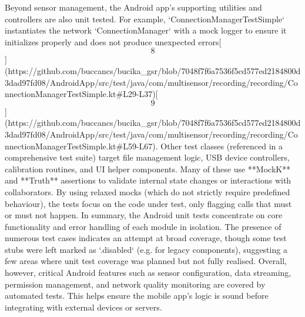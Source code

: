 \documentclass[12pt,a4paper]{article}
\begin{document}
{Beyond sensor management, the Android app's supporting utilities and
controllers are also unit tested. For example,
`ConnectionManagerTestSimple` instantiates the network
`ConnectionManager` with a mock logger to ensure it initializes properly
and does not produce unexpected
errors[\[8\]](https://github.com/buccancs/bucika_gsr/blob/7048f7f6a7536f5cd577ed2184800d3dad97fd08/AndroidApp/src/test/java/com/multisensor/recording/recording/ConnectionManagerTestSimple.kt#L29-L37)[\[9\]](https://github.com/buccancs/bucika_gsr/blob/7048f7f6a7536f5cd577ed2184800d3dad97fd08/AndroidApp/src/test/java/com/multisensor/recording/recording/ConnectionManagerTestSimple.kt#L59-L67).
Other test classes (referenced in a comprehensive test suite) target
file management logic, USB device controllers, calibration routines, and
UI helper components. Many of these use **MockK** and **Truth**
assertions to validate internal state changes or interactions with
collaborators. By using relaxed mocks (which do not strictly require
predefined behaviour), the tests focus on the code under test, only
flagging calls that must or must not happen. In summary, the Android
unit tests concentrate on core functionality and error handling of each
module in isolation. The presence of numerous test cases indicates an
attempt at broad coverage, though some test stubs were left marked as
`.disabled` (e.g. for legacy components), suggesting a few areas where
unit test coverage was planned but not fully realised. Overall, however,
critical Android features such as sensor configuration, data streaming,
permission management, and network quality monitoring are covered by
automated tests. This helps ensure the mobile app's logic is sound
before integrating with external devices or servers.

}
\end{document}
